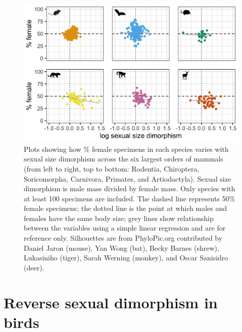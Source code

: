 \documentclass[a4paper, 12pt]{article}
\begin{document}
\begin{figure}[H]
 \centering
  \includegraphics[width = \linewidth]{figures/ssd-orders-mammals.png}
  \caption{Plots showing how \% female specimens in each species varies with sexual size dimorphism across the six largest orders of mammals (from left to right, top to bottom: Rodentia, Chiroptera, Soricomorpha, Carnivora, Primates, and Artiodactyla). 
  Sexual size dimorphism is male mass divided by female mass. 
  Only species with at least 100 specimens are included. 
  The dashed line represents 50\% female specimens; the dotted line is the point at which males and females have the same body size; grey lines show relationship between the variables using a simple linear regression and are for reference only. 
  Silhouettes are from PhyloPic.org contributed by Daniel Jaron (mouse), Yan Wong (bat), Becky Barnes (shrew), Lukasiniho (tiger), Sarah Werning (monkey), and Oscar Sanisidro (deer).}
  \label{fig-mammal-ssd}
\end{figure}

\newpage



\newpage
\section{Reverse sexual dimorphism in birds}
\end{document}
